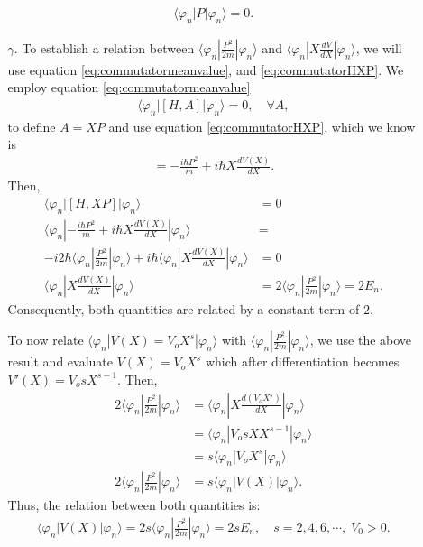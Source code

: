 \documentclass[letterpaper,11pt,twoside]{article}
\newcommand{\braket}[1]{\langle#1\rangle}
\begin{document}
\begin{enumerate}[itemsep=0pt,topsep=0pt,label=\alph*.]
\begin{enumerate}[itemsep=0pt,topsep=0pt]
    \begin{align}
      \braket{\varphi_n|P|\varphi_n}=0.
    \end{align}
    \item[$\gamma$.] To establish a relation between $\braket{\varphi_n|\frac{P^2}{2m}|\varphi_n}$ and $\braket{\varphi_n|X\frac{dV}{dX}|\varphi_n}$, we will use equation 
    \eqref{eq:commutatormeanvalue}, and \eqref{eq:commutatorHXP}. We employ equation \eqref{eq:commutatormeanvalue}
    \begin{align*}
      \braket{\varphi_n|[H,A]|\varphi_n}=0,\quad\forall A,
    \end{align*}
    to define $A=XP$ and use equation \eqref{eq:commutatorHXP}, which we know is
    \begin{align*}
      [H,XP]=-\frac{i\hbar P^2}{m}+i\hbar X\frac{dV(X)}{dX}.
    \end{align*}
    Then, 
    \begin{align*}
      \braket{\varphi_n|[H,XP]|\varphi_n}&=0\\
      \braket{\varphi_n|-\frac{i\hbar P^2}{m}+i\hbar X\frac{dV(X)}{dX}|\varphi_n}&=\\
      -i2\hbar\braket{\varphi_n|\frac{P^2}{2m}|\varphi_n}+i\hbar\braket{\varphi_n|X\frac{dV(X)}{dX}|\varphi_n}&=0\\
      \braket{\varphi_n|X\frac{dV(X)}{dX}|\varphi_n}&=2\braket{\varphi_n|\frac{P^2}{2m}|\varphi_n}=2E_n.
    \end{align*}
    Consequently, both quantities are related by a constant term of $2$.

    To now relate $\braket{\varphi_n|V(X)=V_oX^s|\varphi_n}$ with $\braket{\varphi_n|\frac{P^2}{2m}|\varphi_n}$, we use 
    the above result and evaluate $V(X)=V_oX^s$ which after differentiation becomes $V'(X)=V_osX^{s-1}$. Then,
    \begin{align*}
      2\braket{\varphi_n|\frac{P^2}{2m}|\varphi_n}&=\braket{\varphi_n|X\frac{d(V_oX^s)}{dX}|\varphi_n}\\
      &=\braket{\varphi_n|V_osXX^{s-1}|\varphi_n}\\
      &=s\braket{\varphi_n|V_oX^{s}|\varphi_n}\\
      2\braket{\varphi_n|\frac{P^2}{2m}|\varphi_n}&=s\braket{\varphi_n|V(X)|\varphi_n}.
    \end{align*}
    Thus, the relation between both quantities is:
    \begin{align}
      \braket{\varphi_n|V(X)|\varphi_n}=2s\braket{\varphi_n|\frac{P^2}{2m}|\varphi_n}=2sE_n,\quad s=2,4,6,\cdots,\;V_0>0.
    \end{align}
  \end{enumerate}
\end{enumerate}
\end{document}
